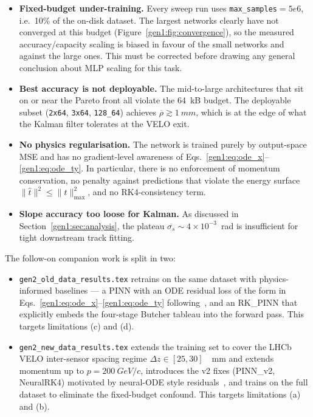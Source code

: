 \documentclass[a4paper,11pt]{article}
\newcommand{\SI}[2]{#1~#2}
\newcommand{\num}[1]{#1}
\newcommand{\kilo}{k}
\newcommand{\byte}{B}
\newcommand{\giga}{G}
\newcommand{\eV}{eV}
\newcommand{\mm}{mm}
\newcommand{\dz}{\Delta z}
\begin{document}
\begin{itemize}\setlength{\itemsep}{2pt}
\item[(a)] \textbf{Fixed-budget under-training.} Every sweep run uses
  \texttt{max\_samples}$=\num{5e6}$, i.e.\ 10\% of the on-disk dataset.
  The largest networks clearly have not converged at this budget
  (Figure~\ref{gen1:fig:convergence}), so the measured
  accuracy/capacity scaling is biased in favour of the small networks
  and against the large ones. This must be corrected before drawing any
  general conclusion about MLP scaling for this task.
\item[(b)] \textbf{Best accuracy is not deployable.} The
  mid-to-large architectures that sit on or near the Pareto front all
  violate the \SI{64}{\kilo\byte} budget.  The deployable subset
  (\texttt{2x64}, \texttt{3x64}, \texttt{128\_64}) achieves
  $\overline{\rho}\gtrsim\SI{1}{\mm}$, which is at the edge of what the
  Kalman filter tolerates at the VELO exit.
\item[(c)] \textbf{No physics regularisation.} The network is trained
  purely by output-space MSE and has no gradient-level awareness of
  Eqs.~\eqref{gen1:eq:ode_x}--\eqref{gen1:eq:ode_ty}. In particular,
  there is no enforcement of momentum conservation, no penalty against
  predictions that violate the energy surface $\|\hat{t}\|^2 \leq
  \|t\|_{\max}^2$, and no RK4-consistency term.
\item[(d)] \textbf{Slope accuracy too loose for Kalman.} As
  discussed in Section~\ref{gen1:sec:analysis}, the plateau
  $\overline{\sigma_s}\sim 4\!\times\!10^{-3}$~rad is insufficient for
  tight downstream track fitting.
\end{itemize}

The follow-on companion work is split in two:
\begin{itemize}\setlength{\itemsep}{2pt}
\item \texttt{gen2\_old\_data\_results.tex} retrains on the same
  dataset with physics-informed baselines --- a PINN with an ODE
  residual loss of the form in Eqs.~\eqref{gen1:eq:ode_x}--\eqref{gen1:eq:ode_ty}
  following~\cite{Raissi2019,Wang2021,Krishnapriyan2021}, and an
  RK\_PINN that explicitly embeds the four-stage Butcher tableau into the
  forward pass. This targets limitations (c) and (d).
\item \texttt{gen2\_new\_data\_results.tex} extends the training set
  to cover the LHCb VELO inter-sensor spacing regime $\dz\in[25,
  30]$~\SI{}{\mm} and extends momentum up to $p=\SI{200}{\giga\eV}/c$,
  introduces the v2 fixes (PINN\_v2, NeuralRK4) motivated by
  neural-ODE style residuals~\cite{Chen2018}, and trains on the full
  dataset to eliminate the fixed-budget confound. This targets
  limitations (a) and (b).
\end{itemize}
\end{document}
